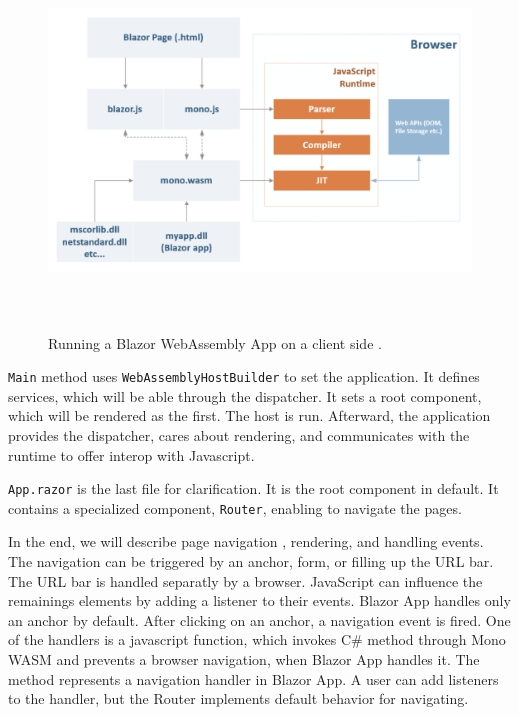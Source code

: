 \begin{figure}[b!]
\centering
\includegraphics[width=140mm, height=100mm]{./img/BlazorExecution}
\caption{Running a Blazor WebAssembly App on a client side \cite{online:composition}.}
\label{img08:wasm}
\end{figure}
\par
\texttt{Main} method uses \texttt{WebAssemblyHostBuilder} to set the application.
It defines services, which will be able through the dispatcher.
It sets a root component, which will be rendered as the first.
The host is run.
Afterward, the application provides the dispatcher, cares about rendering, and communicates with the runtime to offer interop with Javascript.
\par
\texttt{App.razor} is the last file for clarification.
It is the root component in default.
It contains a specialized component, \texttt{Router}, enabling to navigate the pages.
\par
In the end, we will describe page navigation \cite{online:routing}, rendering, and handling events.
The navigation can be triggered by an anchor, form, or filling up the URL bar.
The URL bar is handled separatly by a browser.
JavaScript can influence the remainings elements by adding a listener to their events.
Blazor App handles only an anchor by default.
After clicking on an anchor, a navigation event is fired.
One of the handlers is a javascript function, which invokes C\# method through Mono WASM and prevents a browser navigation, when Blazor App handles it. 
The method represents a navigation handler in Blazor App.
A user can add listeners to the handler, but the Router implements default behavior for navigating.
